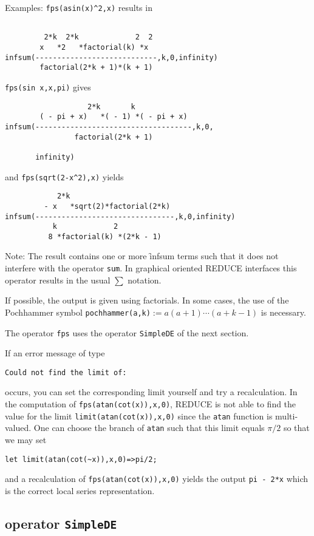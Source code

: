 Examples: \texttt{fps(asin(x)\textasciicircum2,x)} results in
\begin{verbatim}

         2*k  2*k             2  2
        x   *2   *factorial(k) *x
infsum(----------------------------,k,0,infinity)
        factorial(2*k + 1)*(k + 1)
\end{verbatim}
\texttt{fps(sin x,x,pi)} gives
\begin{verbatim}
                   2*k       k
        ( - pi + x)   *( - 1) *( - pi + x)
infsum(------------------------------------,k,0,
                factorial(2*k + 1)

       infinity)
\end{verbatim}
and \texttt{fps(sqrt(2-x\textasciicircum2),x)} yields
\begin{verbatim}
            2*k
         - x   *sqrt(2)*factorial(2*k)
infsum(--------------------------------,k,0,infinity)
           k             2
          8 *factorial(k) *(2*k - 1)
\end{verbatim}
\hypertarget{operator:INFSUM}{}
Note: The result contains one or more \f{infsum} terms such that it does
not interfere with the {\REDUCE} operator \texttt{sum}. In graphical oriented
REDUCE interfaces this operator results in the usual $\sum$ notation.

If possible, the output is given using factorials. In some cases, the
use of the Pochhammer symbol \texttt{pochhammer(a,k)}$:=a(a+1)\cdots(a+k-1)$
is necessary.

The operator \texttt{fps} uses the operator \texttt{SimpleDE} of the next section.

If an error message of type
\begin{verbatim}
Could not find the limit of:
\end{verbatim}
occurs, you can set the corresponding limit yourself and try a
recalculation. In the computation of \texttt{fps(atan(cot(x)),x,0)},
REDUCE is not able to find the value for the limit 
\texttt{limit(atan(cot(x)),x,0)} since the \texttt{atan} function is multi-valued.
One can choose the branch of \texttt{atan} such that this limit equals
$\pi/2$ so that we may set 
\begin{verbatim}
let limit(atan(cot(~x)),x,0)=>pi/2;
\end{verbatim}
and a recalculation of \texttt{fps(atan(cot(x)),x,0)}
yields the output \texttt{pi - 2*x} which is
the correct local series representation.

\subsection{\REDUCE{} operator \texttt{SimpleDE}}
\hypertarget{operator:SIMPLEDE}{}


